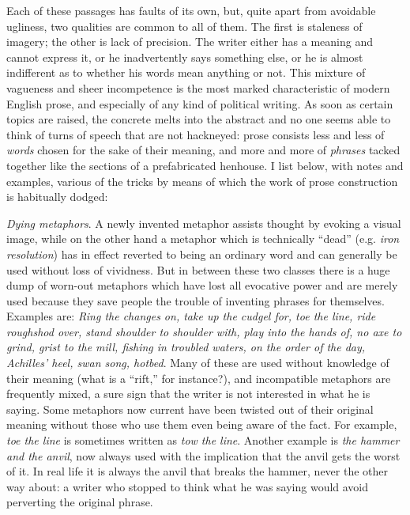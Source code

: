 \documentclass[article,twoside,a4paper]{memoir}
\begin{document}
Each of these passages has faults of its own, but, quite apart from avoidable
ugliness, two qualities are common to all of them. The first is staleness of
imagery; the other is lack of precision. The writer either has a meaning and
cannot express it, or he inadvertently says something else, or he is almost
indifferent as to whether his words mean anything or not. This mixture of vagueness
and sheer incompetence is the most marked characteristic of modern English prose,
and especially of any kind of political writing. As soon as certain topics are
raised, the concrete melts into the abstract and no one seems able to think
of turns of speech that are not hackneyed: prose consists less and less of \emph{words}
chosen for the sake of their meaning, and more and more of \emph{phrases} tacked
together like the sections of a prefabricated henhouse. I list below, with notes
and examples, various of the tricks by means of which the work of prose construction
is habitually dodged:

\emph{Dying metaphors}. A newly invented metaphor assists thought by evoking
a visual image, while on the other hand a metaphor which is technically ``dead''
(e.g. \emph{iron resolution}) has in effect reverted to being an ordinary word
and can generally be used without loss of vividness. But in between these two
classes there is a huge dump of worn-out metaphors which have lost all evocative
power and are merely used because they save people the trouble of inventing
phrases for themselves. Examples are: \emph{Ring the changes on, take up the cudgel
  for, toe the line, ride roughshod over, stand shoulder to shoulder with, play
  into the hands of, no axe to grind, grist to the mill, fishing in troubled waters,
  on the order of the day, Achilles' heel, swan song, hotbed}. Many of these
are used without knowledge of their meaning (what is a ``rift,'' for
instance?), and incompatible metaphors are frequently mixed, a sure sign that
the writer is not interested in what he is saying. Some metaphors now current
have been twisted out of their original meaning without those who use them even
being aware of the fact. For example, \emph{toe the line} is sometimes written
as \emph{tow the line}. Another example is \emph{the hammer and the anvil},
now always used with the implication that the anvil gets the worst of it. In
real life it is always the anvil that breaks the hammer, never the other way
about: a writer who stopped to think what he was saying would avoid perverting
the original phrase.
\end{document}

